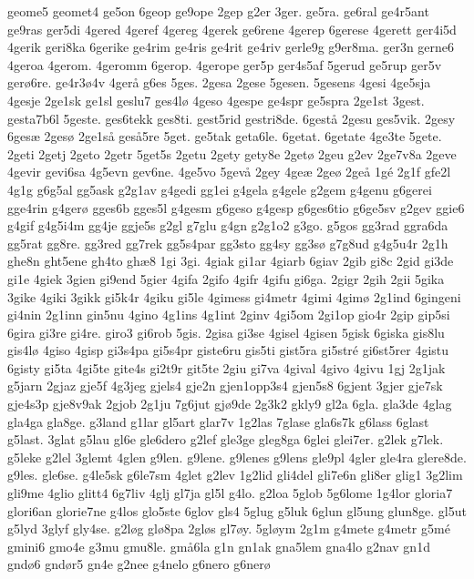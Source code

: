 geome5
geomet4
ge5on
6geop
ge9ope
2gep
g2er
3ger.
ge5ra.
ge6ral
ge4r5ant
ge9ras
ger5di
4gered
4geref
4gereg
4gerek
ge6rene
4gerep
6gerese
4gerett
ger4i5d
4gerik
geri8ka
6gerike
ge4rim
ge4ris
ge4rit
ge4riv
gerle9g
g9er8ma.
ger3n
gerne6
4geroa
4gerom.
4geromm
6gerop.
4gerope
ger5p
ger4s5af
5gerud
ge5rup
ger5v
ger^^f86re.
ge4r3^^f84v
4ger^^e5
g6es
5ges.
2gesa
2gese
5gesen.
5gesens
4gesi
4ge5sja
4gesje
2ge1sk
ge1sl
geslu7
ges4l^^f8
4geso
4gespe
ge4spr
ge5spra
2ge1st
3gest.
gesta7b6l
5geste.
ges6tekk
ges8ti.
gest5rid
gestri8de.
6gest^^e5
2gesu
ges5vik.
2gesy
6ges^^e6
2ges^^f8
2ge1s^^e5
ges^^e55re
5get.
ge5tak
geta6le.
6getat.
6getate
4ge3te
5gete.
2geti
2getj
2geto
2getr
5get5s
2getu
2gety
gety8e
2get^^f8
2geu
g2ev
2ge7v8a
2geve
4gevir
gevi6sa
4g5evn
gev6ne.
4ge5vo
5gev^^e5
2gey
4ge^^e6
2ge^^f8
2ge^^e5
1g^^e9
2g1f
gfe2l
4g1g
g6g5al
gg5ask
g2g1av
g4gedi
gg1ei
g4gela
g4gele
g2gem
g4genu
g6gerei
gge4rin
g4ger^^f8
gges6b
gges5l
g4gesm
g6geso
g4gesp
g6ges6tio
g6ge5sv
g2gev
ggie6
g4gif
g4g5i4m
gg4je
ggje5s
g2gl
g7glu
g4gn
g2g1o2
g3go.
g5gos
gg3rad
ggra6da
gg5rat
gg8re.
gg3red
gg7rek
gg5s4par
gg3sto
gg4sy
gg3s^^f8
g7g8ud
g4g5u4r
2g1h
ghe8n
ght5ene
gh4to
gh^^e68
1gi
3gi.
4giak
gi1ar
4giarb
6giav
2gib
gi8c
2gid
gi3de
gi1e
4giek
3gien
gi9end
5gier
4gifa
2gifo
4gifr
4gifu
gi6ga.
2gigr
2gih
2gii
5gika
3gike
4giki
3gikk
gi5k4r
4giku
gi5le
4gimess
gi4metr
4gimi
4gim^^f8
2g1ind
6gingeni
gi4nin
2g1inn
gin5nu
4gino
4g1ins
4g1int
2ginv
4gi5om
2gi1op
gio4r
2gip
gip5si
6gira
gi3re
gi4re.
giro3
gi6rob
5gis.
2gisa
gi3se
4gisel
4gisen
5gisk
6giska
gis8lu
gis4l^^f8
4giso
4gisp
gi3s4pa
gi5s4pr
giste6ru
gis5ti
gist5ra
gi5str^^e9
gi6st5rer
4gistu
6gisty
gi5ta
4gi5te
gite4s
gi2t9r
git5te
2giu
gi7va
4gival
4givo
4givu
1gj
2g1jak
g5jarn
2gjaz
gje5f
4g3jeg
gjels4
gje2n
gjen1opp3s4
gjen5s8
6gjent
3gjer
gje7sk
gje4s3p
gje8v9ak
2gjob
2g1ju
7g6jut
gj^^f89de
2g3k2
gkly9
gl2a
6gla.
gla3de
4glag
gla4ga
gla8ge.
g3land
g1lar
gl5art
glar7v
1g2las
7glase
gla6s7k
g6lass
6glast
g5last.
3glat
g5lau
gl6e
gle6dero
g2lef
gle3ge
gleg8ga
6glei
glei7er.
g2lek
g7lek.
g5leke
g2lel
3glemt
4glen
g9len.
g9lene.
g9lenes
g9lens
gle9pl
4gler
gle4ra
glere8de.
g9les.
gle6se.
g4le5sk
g6le7sm
4glet
g2lev
1g2lid
gli4del
gli7e6n
gli8er
glig1
3g2lim
gli9me
4glio
glitt4
6g7liv
4glj
gl7ja
gl5l
g4lo.
g2loa
5glob
5g6lome
1g4lor
gloria7
glori6an
glorie7ne
g4los
glo5ste
6glov
gls4
5glug
g5luk
6glun
gl5ung
glun8ge.
gl5ut
g5lyd
3glyf
gly4se.
g2l^^f8g
gl^^f88pa
2gl^^f8s
gl7^^f8y.
5gl^^f8ym
2g1m
g4mete
g4metr
g5m^^e9
gmini6
gmo4e
g3mu
gmu8le.
gm^^e56la
g1n
gn1ak
gna5lem
gna4lo
g2nav
gn1d
gnd^^f86
gnd^^f8r5
gn4e
g2nee
g4nelo
g6nero
g6ner^^f8
